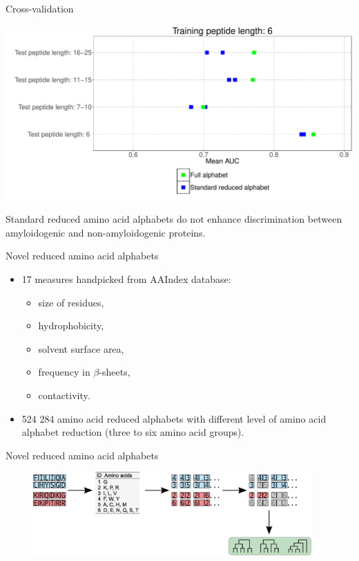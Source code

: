 \documentclass{beamer}\usepackage[]{graphicx}\usepackage[]{color}
\makeatletter
\def\maxwidth{ %
  \ifdim\Gin@nat@width>\linewidth
    \linewidth
  \else
    \Gin@nat@width
  \fi
}
\newenvironment{knitrout}{}{} %
\makeatother
\begin{document}
    \begin{frame}{Cross-validation}
\begin{knitrout}
\color{fgcolor}

{\centering \includegraphics[width=\maxwidth]{figure/unnamed-chunk-2-1} 

}



\end{knitrout}

Standard reduced amino acid alphabets do not enhance discrimination between amyloidogenic and non-amyloidogenic proteins.
  
  \end{frame}


\begin{frame}{Novel reduced amino acid alphabets}

\begin{itemize}
\item 17 measures handpicked from AAIndex database: 
  \begin{itemize}
    \item size of residues, 
    \item hydrophobicity, 
    \item solvent surface area, 
    \item frequency in $\beta$-sheets,
    \item contactivity.
  \end{itemize}
  \item 524 284 amino acid reduced alphabets with different level of amino acid alphabet reduction (three to six amino acid groups).
  \end{itemize}

    \end{frame}
  
    \begin{frame}{Novel reduced amino acid alphabets}
\begin{figure} 
\includegraphics[width=0.95\textwidth]{static_figure/ngram2.eps}
\end{figure}
  \end{frame}
\end{document}
